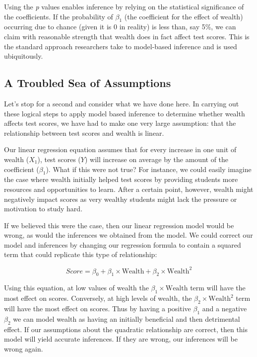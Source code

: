 \documentclass[]{memoir}
\begin{document}
Using the \emph{p} values enables inference by relying on the
statistical significance of the coefficients. If the probability of
$\beta_1$ (the coefficient for the effect of wealth) occurring due to
chance (given it is 0 in reality) is less than, say 5\%, we can claim
with reasonable strength that wealth does in fact affect test scores.
This is the standard approach researchers take to model-based inference
and is used ubiquitously.

\subsection{A Troubled Sea of Assumptions}

Let's stop for a second and consider what we have done here. In carrying
out these logical steps to apply model based inference to determine
whether wealth affects test scores, we have had to make one very large
assumption: that the relationship between test scores and wealth is
linear.

Our linear regression equation assumes that for every increase in one
unit of wealth ($X_1$), test scores ($Y$) will increase on average by
the amount of the coefficient ($\beta_1$). What if this were not true?
For instance, we could easily imagine the case where wealth initially
helped test scores by providing students more resources and
opportunities to learn. After a certain point, however, wealth might
negatively impact scores as very wealthy students might lack the
pressure or motivation to study hard.

If we believed this were the case, then our linear regression model
would be wrong, as would the inferences we obtained from the model. We
could correct our model and inferences by changing our regression
formula to contain a squared term that could replicate this type of
relationship:

\[ Score = \beta_0 + \beta_1 \times \text{Wealth} + \beta_2 \times \text{Wealth}^2 \]

Using this equation, at low values of wealth the
$\beta_1 \times \text{Wealth}$ term will have the most effect on scores.
Conversely, at high levels of wealth, the
$\beta_2 \times \text{Wealth}^2$ term will have the most effect on
scores. Thus by having a positive $\beta_1$ and a negative $\beta_2$ we
can model wealth as having an initially beneficial and then detrimental
effect. If our assumptions about the quadratic relationship are correct,
then this model will yield accurate inferences. If they are wrong, our
inferences will be wrong again.
\end{document}
